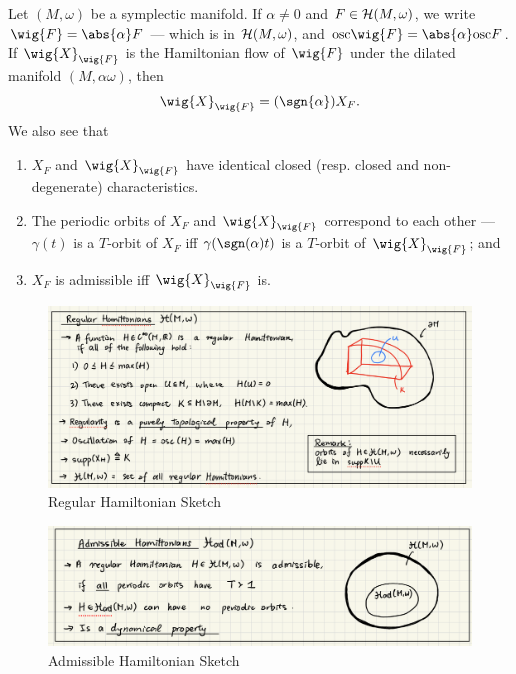 \documentclass[../main-v2-manifolds.tex]{subfiles}
\begin{document}
\begin{wts}\label{thm:conformality of frakco}
    Let $(M,\omega)$ be a symplectic manifold. If $\alpha\neq 0$ and $F\in\mathcal{H}(M,\omega)$, we write $\wig{F}=\abs{\alpha}F$ --- which is in $\mathcal{H}(M,\omega)$, and $\osc{\wig{F}} = \abs{\alpha}\osc{F}$. If $\wig{X}_{\wig{F}}$ is the Hamiltonian flow of $\wig{F}$ under the dilated manifold $(M,\alpha\omega)$, then 
    \[
        \wig{X}_{\wig{F}} = (\sgn{\alpha})X_{F}.
    \]
    We also see that
    \begin{enumerate}
        \item $X_{F}$ and $\wig{X}_{\wig{F}}$ have identical closed (resp. closed and non-degenerate) characteristics. 
        \item The periodic orbits of $X_F$ and $\wig{X}_{\wig{F}}$ correspond to each other --- $\gamma(t)$ is a $T$-orbit of $X_F$ iff $\gamma(\sgn(\alpha)t)$ is a $T$-orbit of $\wig{X}_{\wig{F}}$; and 
        \item $X_F$ is admissible iff $\wig{X}_{\wig{F}}$ is.
    \end{enumerate}
\end{wts}
\clearpage
\begin{figure}[h!]
    \centering
    \includegraphics[width=0.85\linewidth]{images/regular-hamiltonian-sketch.png}
    \caption{Regular Hamiltonian Sketch}
    \label{fig:regular-hamiltonian-sketch}
\end{figure}
\begin{figure}[h!]
    \centering
    \includegraphics[width=0.85\linewidth]{images/admissible-hamiltonian-sketch.png}
    \caption{Admissible Hamiltonian Sketch}
    \label{fig:admissible-hamiltonian-sketch}
\end{figure}
\end{document}
